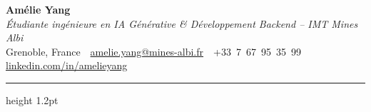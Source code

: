 \documentclass[10.5pt,a4paper]{article}
\begin{document}
\begin{center}
  {\fontsize{26}{30}\selectfont\bfseries Amélie Yang}\\[4pt]
  {\color{accent}\itshape\large Étudiante ingénieure en IA Générative \& Développement Backend -- IMT Mines Albi}\\[6pt]
  {\small
    Grenoble, France
    \,\textbullet\,
    \href{mailto:amelie.yang@mines-albi.fr}{amelie.yang@mines-albi.fr}
    \,\textbullet\,
    +33~7~67~95~35~99
    \,\textbullet\,
    \href{https://www.linkedin.com/in/amelieyang}{linkedin.com/in/amelieyang}
  }
\end{center}

\vspace{3pt}
{\color{accent}\hrule height 1.2pt}
\vspace{4pt}
\end{document}
